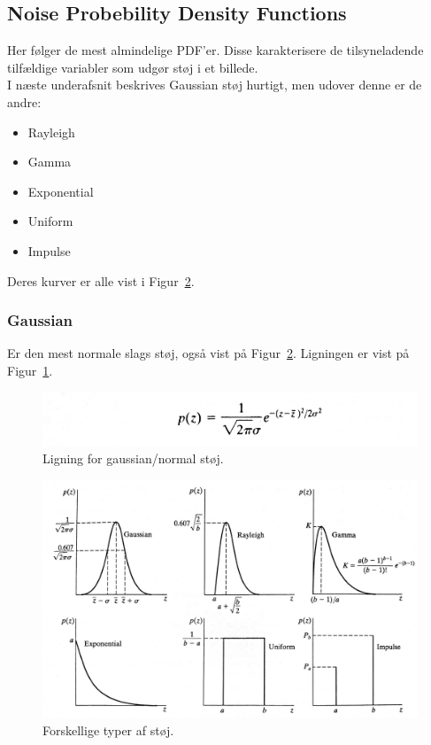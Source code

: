 \subsection{Noise Probebility Density Functions}

Her følger de mest almindelige PDF'er. Disse karakterisere de tilsyneladende tilfældige variabler som udgør støj i et billede.\\

I næste underafsnit beskrives Gaussian støj hurtigt, men udover denne er de andre:

\begin{itemize}
	\item Rayleigh
	\item Gamma
	\item Exponential
	\item Uniform
	\item Impulse
\end{itemize}

Deres kurver er alle vist i Figur~\ref{fig:noise-graphs}.

\subsubsection{Gaussian}

Er den mest normale slags støj, også vist på Figur~\ref{fig:noise-graphs}. Ligningen er vist på Figur~\ref{fig:gaussian-pdf}.

\begin{figure}[H]
	\centering
	\includegraphics[width=0.7\linewidth]{figs/spm06/gaussian-pdf}
	\caption{Ligning for gaussian/normal støj.}
	\label{fig:gaussian-pdf}
\end{figure}

\begin{figure}[H]
	\centering
	\includegraphics[width=\linewidth]{figs/spm06/noise-graphs}
	\caption{Forskellige typer af støj.}
	\label{fig:noise-graphs}
\end{figure}
